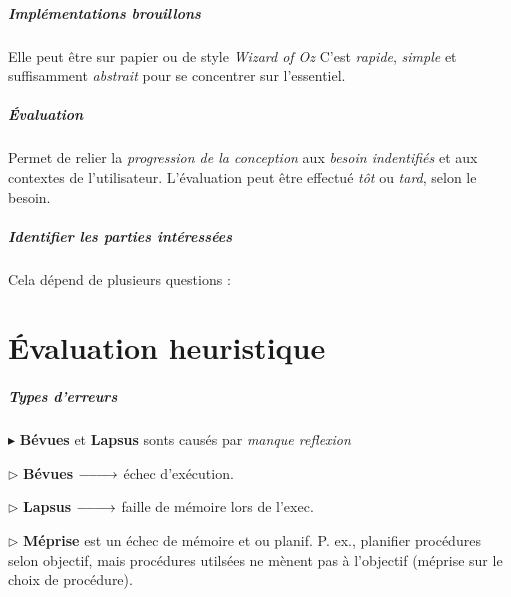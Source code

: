 \documentclass{report}
\DeclareRobustCommand{\looongrightarrow}{%
  \DOTSB\relbar\joinrel\relbar\joinrel\relbar\joinrel\rightarrow
}
\begin{document}
\begin{multicols*}{3}
    \paragraph{Implémentations brouillons}
    Elle peut être sur papier ou de style \textit{Wizard of Oz}  
    C'est \textit{rapide}, \textit{simple} et suffisamment 
    \textit{abstrait} pour se concentrer sur l'essentiel.   


    \paragraph{Évaluation}
    Permet de relier la \textit{progression de la conception} aux 
    \textit{besoin indentifiés} et aux contextes de l'utilisateur. 
    L'évaluation peut être effectué \textit{tôt} ou \textit{tard}, 
    selon le besoin. 


    \paragraph{Identifier les parties intéressées}
    Cela dépend de plusieurs questions :

    \chapter{Évaluation heuristique}

    \paragraph{Types d'erreurs}
    \mbox{}\vspace{0.4em}
  
    \noindent$\blacktriangleright$
    \textbf{Bévues} et \textbf{Lapsus} sonts causés par 
        \textit{manque reflexion}  

    \noindent  $\rhd$ \textbf{Bévues} $\looongrightarrow$ échec d'exécution.    

    \noindent  $\rhd$ \textbf{Lapsus} $\looongrightarrow$ faille de 
    mémoire lors de l'exec.  

    \noindent $\rhd$ \textbf{Méprise} est un échec de mémoire et ou planif. P. ex., 
        planifier procédures selon objectif, mais procédures utilsées 
        ne mènent pas à l'objectif (méprise sur le choix de procédure). 



\end{multicols*}
\end{document}

